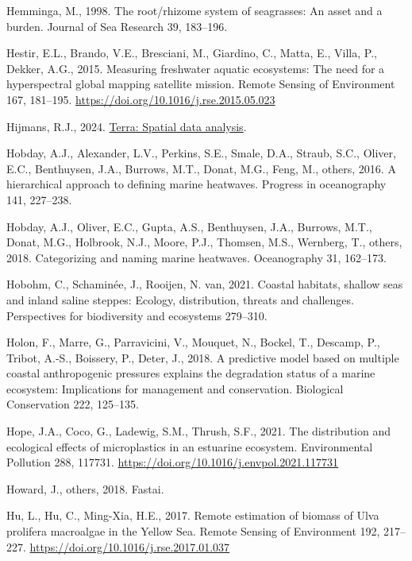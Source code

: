 \documentclass[
  letterpaper,
  11pt,
  english,
  singlespacing,
  headsepline]{MastersDoctoralThesis}
\newlength{\cslhangindent}
\newenvironment{CSLReferences}[2] %
 {\begin{list}{}{%
  \setlength{\itemindent}{0pt}
  \setlength{\leftmargin}{0pt}
  \setlength{\parsep}{0pt}
  \ifodd #1
   \setlength{\leftmargin}{\cslhangindent}
   \setlength{\itemindent}{-1\cslhangindent}
  \fi
  \setlength{\itemsep}{#2\baselineskip}}}
 {\end{list}}
\begin{document}
\begin{CSLReferences}{1}{0}
Hemminga, M., 1998. The root/rhizome system of seagrasses: An asset and
a burden. Journal of Sea Research 39, 183--196.

Hestir, E.L., Brando, V.E., Bresciani, M., Giardino, C., Matta, E.,
Villa, P., Dekker, A.G., 2015. {Measuring freshwater aquatic ecosystems:
The need for a hyperspectral global mapping satellite mission}. Remote
Sensing of Environment 167, 181--195.
\url{https://doi.org/10.1016/j.rse.2015.05.023}

Hijmans, R.J., 2024.
\href{https://CRAN.R-project.org/package\%20=\%20terra}{Terra: Spatial
data analysis}.

Hobday, A.J., Alexander, L.V., Perkins, S.E., Smale, D.A., Straub, S.C.,
Oliver, E.C., Benthuysen, J.A., Burrows, M.T., Donat, M.G., Feng, M.,
others, 2016. A hierarchical approach to defining marine heatwaves.
Progress in oceanography 141, 227--238.

Hobday, A.J., Oliver, E.C., Gupta, A.S., Benthuysen, J.A., Burrows,
M.T., Donat, M.G., Holbrook, N.J., Moore, P.J., Thomsen, M.S., Wernberg,
T., others, 2018. Categorizing and naming marine heatwaves. Oceanography
31, 162--173.

Hobohm, C., Schaminée, J., Rooijen, N. van, 2021. Coastal habitats,
shallow seas and inland saline steppes: Ecology, distribution, threats
and challenges. Perspectives for biodiversity and ecosystems 279--310.

Holon, F., Marre, G., Parravicini, V., Mouquet, N., Bockel, T., Descamp,
P., Tribot, A.-S., Boissery, P., Deter, J., 2018. A predictive model
based on multiple coastal anthropogenic pressures explains the
degradation status of a marine ecosystem: Implications for management
and conservation. Biological Conservation 222, 125--135.

Hope, J.A., Coco, G., Ladewig, S.M., Thrush, S.F., 2021. {The
distribution and ecological effects of microplastics in an estuarine
ecosystem}. Environmental Pollution 288, 117731.
\url{https://doi.org/10.1016/j.envpol.2021.117731}

Howard, J., others, 2018. Fastai.

Hu, L., Hu, C., Ming-Xia, H.E., 2017. {Remote estimation of biomass of
Ulva prolifera macroalgae in the Yellow Sea}. Remote Sensing of
Environment 192, 217--227.
\url{https://doi.org/10.1016/j.rse.2017.01.037}


\end{CSLReferences}
\end{document}

